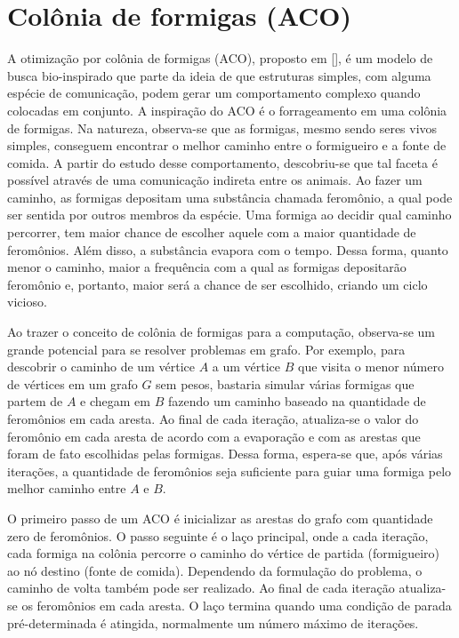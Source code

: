 \section{Colônia de formigas (ACO)}
A otimização por colônia de formigas (ACO), proposto em [], é um modelo de busca bio-inspirado que parte da ideia de que estruturas simples, com alguma espécie de comunicação, podem gerar um comportamento complexo quando colocadas em conjunto. A inspiração do ACO é o forrageamento em uma colônia de formigas. Na natureza, observa-se que as formigas, mesmo sendo seres vivos simples, conseguem encontrar o melhor caminho entre o formigueiro e a fonte de comida. A partir do estudo desse comportamento, descobriu-se que tal faceta é possível através de uma comunicação indireta entre os animais. Ao fazer um caminho, as formigas depositam uma substância chamada feromônio, a qual pode ser sentida por outros membros da espécie. Uma formiga ao decidir qual caminho percorrer, tem maior chance de escolher aquele com a maior quantidade de feromônios. Além disso, a substância evapora com o tempo. Dessa forma, quanto menor o caminho, maior a frequência com a qual as formigas depositarão feromônio e, portanto, maior será a chance de ser escolhido, criando um ciclo vicioso.

Ao trazer o conceito de colônia de formigas para a computação, observa-se um grande potencial para se resolver problemas em grafo. Por exemplo, para descobrir o caminho de um vértice $A$ a um vértice $B$ que visita o menor número de vértices em um grafo $G$ sem pesos, bastaria simular várias formigas que partem de $A$ e chegam em $B$ fazendo um caminho baseado na quantidade de feromônios em cada aresta. Ao final de cada iteração, atualiza-se o valor do feromônio em cada aresta de acordo com a evaporação e com as arestas que foram de fato escolhidas pelas formigas. Dessa forma, espera-se que, após várias iterações, a quantidade de feromônios seja suficiente para guiar uma formiga pelo melhor caminho entre $A$ e $B$.

O primeiro passo de um ACO é inicializar as arestas do grafo com quantidade zero de feromônios. O passo seguinte é o laço principal, onde a cada iteração, cada formiga na colônia percorre o caminho do vértice de partida (formigueiro) ao nó destino (fonte de comida). Dependendo da formulação do problema, o caminho de volta também pode ser realizado. Ao final de cada iteração atualiza-se os feromônios em cada aresta. O laço termina quando uma condição de parada pré-determinada é atingida, normalmente um número máximo de iterações.

